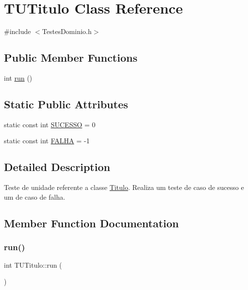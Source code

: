 \hypertarget{class_t_u_titulo}{}\section{T\+U\+Titulo Class Reference}
\label{class_t_u_titulo}


{\ttfamily \#include $<$Testes\+Dominio.\+h$>$}

\subsection*{Public Member Functions}
\begin{DoxyCompactItemize}
\item 
int \hyperlink{class_t_u_titulo_a2bf05b935f07f368b03c694d1f8ce8c7}{run} ()
\end{DoxyCompactItemize}
\subsection*{Static Public Attributes}
\begin{DoxyCompactItemize}
\item 
static const int \hyperlink{class_t_u_titulo_aaea6696cee40d23798e3777c1e17688f}{S\+U\+C\+E\+S\+SO} = 0
\item 
static const int \hyperlink{class_t_u_titulo_a5f60ebb41aa0607f6a7a4b825907b6ee}{F\+A\+L\+HA} = -\/1
\end{DoxyCompactItemize}


\subsection{Detailed Description}
Teste de unidade referente a classe \hyperlink{class_titulo}{Titulo}. Realiza um teste de caso de sucesso e um de caso de falha. 

\subsection{Member Function Documentation}
\mbox{\label{class_t_u_titulo_a2bf05b935f07f368b03c694d1f8ce8c7}} 
\subsubsection{\texorpdfstring{run()}{run()}}
{\footnotesize\ttfamily int T\+U\+Titulo\+::run (\begin{DoxyParamCaption}{ }\end{DoxyParamCaption})}



